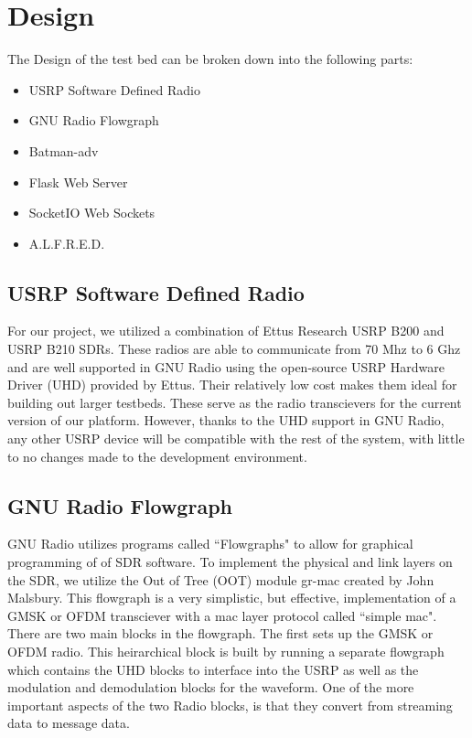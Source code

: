 \section{Design}

The Design of the test bed can be broken down into the following parts:

\begin{itemize}
	\item USRP Software Defined Radio
	\item GNU Radio Flowgraph
	\item Batman-adv
	\item Flask Web Server
	\item SocketIO Web Sockets
	\item A.L.F.R.E.D. 
\end{itemize}

\subsection{USRP Software Defined Radio}

For our project, we utilized a combination of Ettus Research USRP B200 and USRP B210 SDRs. These radios are able to communicate from 70 Mhz to 6 Ghz and are well supported in GNU Radio using the open-source USRP Hardware Driver (UHD) provided by Ettus. Their relatively low cost makes them ideal for building out larger testbeds. These serve as the radio transcievers for the current version of our platform. However, thanks to the UHD support in GNU Radio, any other USRP device will be compatible with the rest of the system, with little to no changes made to the development environment. 

\subsection{GNU Radio Flowgraph}

GNU Radio utilizes programs called ``Flowgraphs" to allow for graphical programming of of SDR software. To implement the physical and link layers on the SDR, we utilize the Out of Tree (OOT) module gr-mac created by John Malsbury. This flowgraph is a very simplistic, but effective, implementation of a GMSK or OFDM transciever with a mac layer protocol called ``simple mac". There are two main blocks in the flowgraph. The first sets up the GMSK or OFDM radio. This heirarchical block is built by running a separate flowgraph which contains the UHD blocks to interface into the USRP as well as the modulation and demodulation blocks for the waveform. One of the more important aspects of the two Radio blocks, is that they convert from streaming data to message data. 


